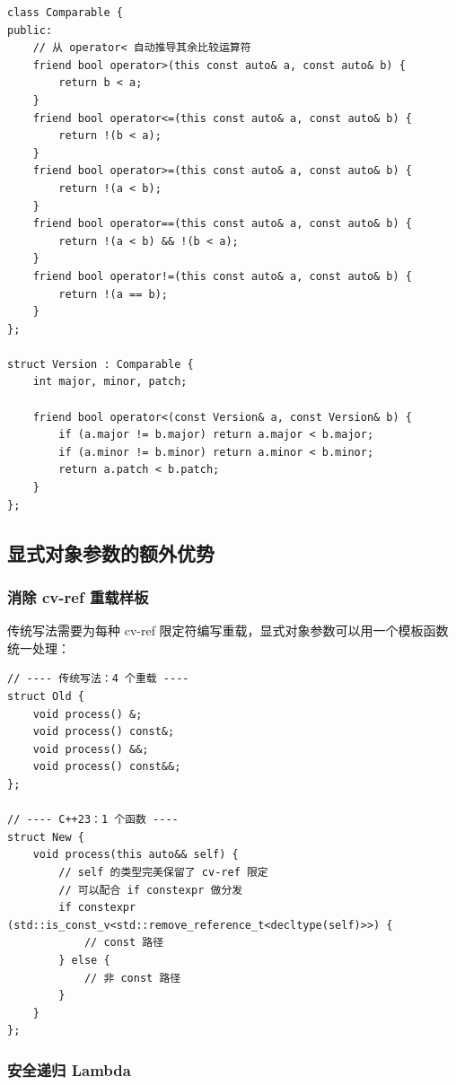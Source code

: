 \documentclass[12pt,a4paper,fontset=fandol]{ctexbook}
\begin{document}
\begin{lstlisting}[caption={C++23 运算符混入}]
class Comparable {
public:
    // 从 operator< 自动推导其余比较运算符
    friend bool operator>(this const auto& a, const auto& b) {
        return b < a;
    }
    friend bool operator<=(this const auto& a, const auto& b) {
        return !(b < a);
    }
    friend bool operator>=(this const auto& a, const auto& b) {
        return !(a < b);
    }
    friend bool operator==(this const auto& a, const auto& b) {
        return !(a < b) && !(b < a);
    }
    friend bool operator!=(this const auto& a, const auto& b) {
        return !(a == b);
    }
};

struct Version : Comparable {
    int major, minor, patch;

    friend bool operator<(const Version& a, const Version& b) {
        if (a.major != b.major) return a.major < b.major;
        if (a.minor != b.minor) return a.minor < b.minor;
        return a.patch < b.patch;
    }
};
\end{lstlisting}

\subsection{显式对象参数的额外优势}

\subsubsection{消除 cv-ref 重载样板}

传统写法需要为每种 cv-ref 限定符编写重载，显式对象参数可以用一个模板函数统一处理：

\begin{lstlisting}[caption={消除 cv-ref 重载}]
// ---- 传统写法：4 个重载 ----
struct Old {
    void process() &;
    void process() const&;
    void process() &&;
    void process() const&&;
};

// ---- C++23：1 个函数 ----
struct New {
    void process(this auto&& self) {
        // self 的类型完美保留了 cv-ref 限定
        // 可以配合 if constexpr 做分发
        if constexpr (std::is_const_v<std::remove_reference_t<decltype(self)>>) {
            // const 路径
        } else {
            // 非 const 路径
        }
    }
};
\end{lstlisting}

\subsubsection{安全递归 Lambda}
\end{document}
